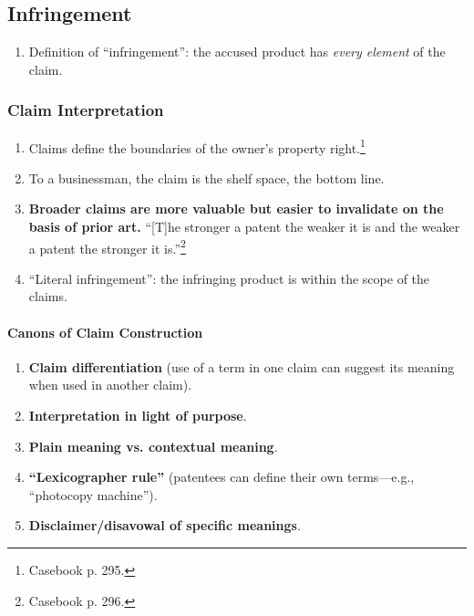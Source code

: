 \subsection{Infringement}

\begin{enumerate}
    \item Definition of ``infringement'': the accused product has \emph{every 
    element} of the claim.
\end{enumerate}

\subsubsection{Claim Interpretation}

\begin{enumerate}
    \item Claims define the boundaries of the owner's property 
    right.\footnote{Casebook p. 295.}
    \item To a businessman, the claim is the shelf space, the bottom line.
    \item \textbf{Broader claims are more valuable but easier to invalidate on 
    the basis of prior art.} ``[T]he stronger a patent the weaker it is and the 
    weaker a patent the stronger it is.''\footnote{Casebook p. 296.}
    \item ``Literal infringement'': the infringing product is within the scope 
    of the claims.
\end{enumerate}

\paragraph{Canons of Claim Construction}

\begin{enumerate}
    \item \textbf{Claim differentiation} (use of a term in one claim can 
    suggest its meaning when used in another claim).
    \item \textbf{Interpretation in light of purpose}.
    \item \textbf{Plain meaning vs. contextual meaning}.
    \item \textbf{``Lexicographer rule''} (patentees can define their own 
    terms---e.g., ``photocopy machine'').
    \item \textbf{Disclaimer/disavowal of specific meanings}.
\end{enumerate}

